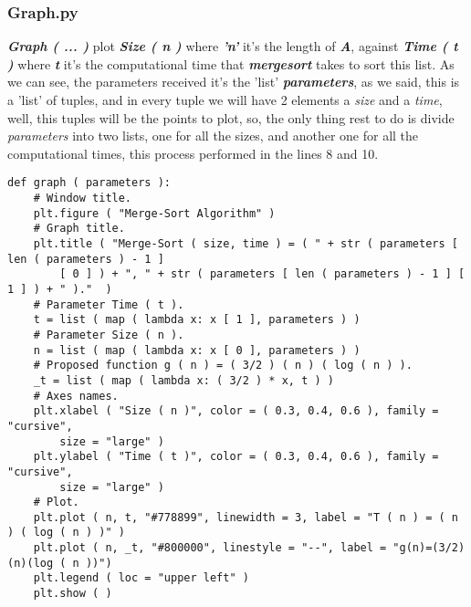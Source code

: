 \pagebreak

\subsubsection{Graph.py}

{\bfseries\itshape Graph ( ... )} plot {\bfseries\itshape Size ( n )} where {\bfseries\itshape 'n'} it's the length of {\bfseries\itshape A}, against {\bfseries\itshape Time ( t )} where {\bfseries\itshape t} it's the computational time that {\bfseries\itshape mergesort} takes to sort this list. As we can see, the parameters received it's the 'list' {\bfseries\itshape parameters}, as we said, this is a 'list' of tuples, and in every tuple we will have 2 elements a {\itshape size} and a {\itshape time}, well, this tuples will be the points to plot, so, the only thing rest to do is divide {\itshape parameters} into two lists, one for all the sizes, and another one for all the computational times, this process performed in the lines 8 and 10. \hfill \break

\begin{lstlisting}
def graph ( parameters ):
    # Window title.
    plt.figure ( "Merge-Sort Algorithm" )
    # Graph title.
    plt.title ( "Merge-Sort ( size, time ) = ( " + str ( parameters [ len ( parameters ) - 1 ] 
    	[ 0 ] ) + ", " + str ( parameters [ len ( parameters ) - 1 ] [ 1 ] ) + " )."  )
    # Parameter Time ( t ).
    t = list ( map ( lambda x: x [ 1 ], parameters ) )
    # Parameter Size ( n ).
    n = list ( map ( lambda x: x [ 0 ], parameters ) )
    # Proposed function g ( n ) = ( 3/2 ) ( n ) ( log ( n ) ).
    _t = list ( map ( lambda x: ( 3/2 ) * x, t ) )
    # Axes names.
    plt.xlabel ( "Size ( n )", color = ( 0.3, 0.4, 0.6 ), family = "cursive", 
    	size = "large" )
    plt.ylabel ( "Time ( t )", color = ( 0.3, 0.4, 0.6 ), family = "cursive", 
    	size = "large" )
    # Plot.
    plt.plot ( n, t, "#778899", linewidth = 3, label = "T ( n ) = ( n ) ( log ( n ) )" )
    plt.plot ( n, _t, "#800000", linestyle = "--", label = "g(n)=(3/2)(n)(log ( n ))")
    plt.legend ( loc = "upper left" )
    plt.show ( )
\end{lstlisting} \hfill

{\bfseries\itshape\color{armygreen}{Observation:}} {\itshape{}}


